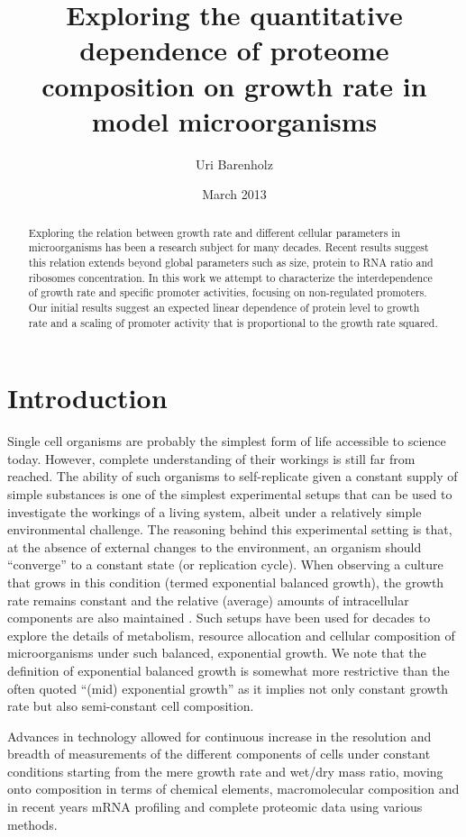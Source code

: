 \documentclass[a4page]{report}
\title{Exploring the quantitative dependence of proteome composition on growth rate in model microorganisms}
\author{Uri Barenholz}
\date{March 2013}
\begin{document}
\maketitle
\begin{abstract}
Exploring the relation between growth rate and different cellular parameters in microorganisms has been a research subject for many decades.
Recent results suggest this relation extends beyond global parameters such as size, protein to RNA ratio and ribosomes concentration.
In this work we attempt to characterize the interdependence of growth rate and specific promoter activities, focusing on non-regulated promoters.
Our initial results suggest an expected linear dependence of protein level to growth rate and a scaling of promoter activity that is proportional to the growth rate squared.
\end{abstract}

\tableofcontents

\section{Introduction}
Single cell organisms are probably the simplest form of life accessible to science today.
However, complete understanding of their workings is still far from reached.
The ability of such organisms to self-replicate given a constant supply of simple substances is one of the simplest experimental setups that can be used to investigate the workings of a living system, albeit under a relatively simple environmental challenge.
The reasoning behind this experimental setting is that, at the absence of external changes to the environment, an organism should “converge” to a constant state (or replication cycle).
When observing a culture that grows in this condition (termed exponential balanced growth), the growth rate remains constant and the relative (average) amounts of intracellular components are also maintained \cite{Campbell1957}.
Such setups have been used for decades \cite{Schaechter1958,Maaloe1969,Pedersen1978a} to explore the details of metabolism, resource allocation and cellular composition of microorganisms under such balanced, exponential growth.
We note that the definition of exponential balanced growth is somewhat more restrictive than the often quoted ``(mid) exponential growth'' as it implies not only constant growth rate but also semi-constant cell composition.

Advances in technology allowed for continuous increase in the resolution and breadth of measurements of the different components of cells under constant conditions starting from the mere growth rate and wet/dry mass ratio, moving onto composition in terms of chemical elements, macromolecular composition and in recent years mRNA profiling and complete proteomic data using various methods.
\end{document}
